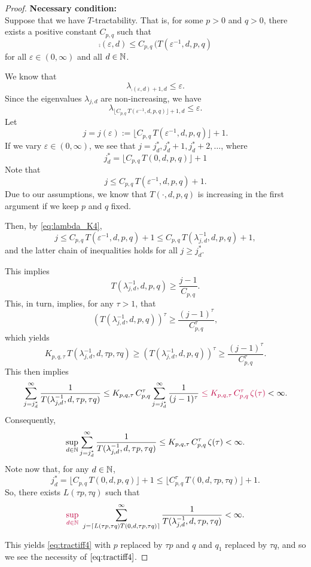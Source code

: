 \documentclass[11pt,a4paper]{article}
\newcommand{\peter}[1]{\begingroup\color{purple}#1\endgroup}
\begin{document}
\begin{proof}
\textbf{Necessary condition:}\\
Suppose that we have
$T$-tractability. That is, for some $p>0$ and $q>0$, there exists a positive constant $C_{p,q}$ such that
\[
\comp(\varepsilon,d)\le C_{p,q}\, (T(\varepsilon^{-1},d,p,q)
\]
for all $\varepsilon\in (0,\infty)$ and all $d\in\mathbb{N}$.


We know that
\[
\lambda_{\comp(\varepsilon,d)+1,d}\le \varepsilon.
\]
Since the eigenvalues $\lambda_{j,d}$ are non-increasing, we have
\begin{equation}\label{eq:lambda_K4}
\lambda_{\lfloor C_{p,q}\, T(\varepsilon^{-1},d,p,q)\rfloor +1,d}\le \varepsilon.
\end{equation}
Let
\[
j=j (\varepsilon):= \lfloor C_{p,q}\, T(\varepsilon^{-1},d,p,q)\rfloor +1.
\]
If we vary $\varepsilon\in (0,\infty)$, we see that $j=j_d^*, j_d^*+1, j_d^*+2,\ldots$, where
\[
  j_d^*=\lfloor C_{p,q}\, T(0,d,p,q)\rfloor +1
\]
Note that
\[
j\le C_{p,q}\, T(\varepsilon^{-1},d,p,q) +1.
\]
Due to our assumptions, we know that
$T(\cdot,d,p,q)$ is increasing in the first argument if
we keep $p$ and $q$ fixed.

Then, by \eqref{eq:lambda_K4},
\[
j \le C_{p,q}\, T(\varepsilon^{-1},d,p,q) +1 \le C_{p,q}\, T(\lambda_{j,d}^{-1},d,p,q) +1,
\]
and the latter chain of inequalities holds for all $j\ge j_d^*$.

This implies
\[
T(\lambda_{j,d}^{-1},d, p,q) \ge \frac{j-1}{C_{p,q}}.
\]
This, in turn, implies, for any $\tau>1$, that
\[
 (T(\lambda_{j,d}^{-1},d,p,q))^\tau \ge \frac{(j-1)^\tau}{C_{p,q}^\tau},
\]
which yields
\[
 K_{p,q,\tau}\, T (\lambda_{j,d}^{-1},d,\tau p,\tau q) \ge (T(\lambda_{j,d}^{-1},d, p,q))^\tau
 \ge \frac{(j-1)^\tau}{C_{p,q}^\tau}.
\]
This then implies
\[
\sum_{j=j_d^*}^\infty \frac{1}{T(\lambda_{j,d}^{-1},d, \tau p,\tau q)}
\le K_{p,q,\tau}\, C_{p,q}^\tau \sum_{j=j_d^*}^\infty \frac{1}{(j-1)^\tau}
\peter{\le K_{p,q,\tau}\, C_{p,q}^\tau \, \zeta(\tau)}
<\infty.
\]
\peter{
Consequently,
\[
\sup_{d\in\mathbb{N}} \sum_{j=j_d^*}^\infty \frac{1}{T(\lambda_{j,d}^{-1},d, \tau p,\tau q)} \le K_{p,q,\tau}\, C_{p,q}^\tau \, \zeta(\tau) < \infty.
\]
}
Note now that, \peter{for any $d\in\mathbb{N}$,}
\[
 j_d^* = \lfloor C_{p,q}\, T(0,d,p,q)\rfloor +1 \le \lfloor C_{p,q}^\tau\, T(0,d,\tau p,\tau q)\rfloor +1.
\]
So, there exists $L(\tau p,\tau q)$ such that
\[
\peter{\sup_{d\in\naturals}}\,\, \sum_{j=\lceil L(\tau p,\tau q) T(0,d,\tau p,\tau q)\rceil}^\infty \frac{1}{T(\lambda_{j,d}^{-1},d, \tau p,\tau q)}<\infty.
\]


This yields \eqref{eq:tractiff4} with $p$ replaced by $\tau p$ and $q$ and $q_1$ replaced by $\tau q$, and so we see the necessity of $\eqref{eq:tractiff4}$.

\end{proof}
\end{document}

